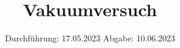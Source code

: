 

\subject{v70}
\title{Vakuumversuch}
\date{%
  Durchführung: 17.05.2023
  \hspace{3em}
  Abgabe: 10.06.2023
}



\maketitle
\thispagestyle{empty}
\tableofcontents
\newpage






\printbibliography{}


